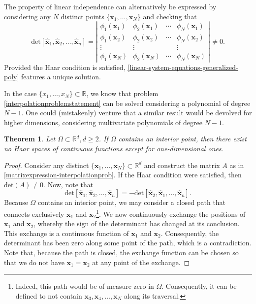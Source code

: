 \documentclass[12pt]{report} %
\newtheorem{theorem}{Theorem}
\newcommand{\tmmathbf}[1]{\ensuremath{\boldsymbol{#1}}}
\begin{document}
The property of linear independence can alternatively be expressed by
considering any $N$ distinct points  \{$\tmmathbf{x}_1, \ldots,
\tmmathbf{x}_N$\}  and checking that
\[ \text{det}  [\hat{\tmmathbf{x}}_1, \hat{\tmmathbf{x}}_2, \ldots,
   \hat{\tmmathbf{x}}_n] = \left|\begin{array}{cccc}
     \phi_1 (\tmmathbf{x}_1) & \phi_2 (\tmmathbf{x}_1) & \cdots  & \phi_N
     (\tmmathbf{x}_1)\\
     \phi_1 (\tmmathbf{x}_2) & \phi_2 (\tmmathbf{x}_2) & \cdots  & \phi_N
     (\tmmathbf{x}_2)\\
     \vdots & \vdots &  & \vdots\\
     \phi_1 (\tmmathbf{x}_N) & \phi_2 (\tmmathbf{x}_N) & \cdots  & \phi_N
     (\tmmathbf{x}_N)
   \end{array}\right| \neq 0. \]
Provided the Haar condition is satisfied,
\eqref{linear-system-equations-generalized-poly} features a unique solution.

In the case $\{ x_1, \ldots, x_N \} \subset \mathbb{R}$, we know that problem
\ref{interpolationproblemstatement} can be solved considering a polynomial of
degree $N - 1$. One could (mistakenly) venture that a similar result would be devolved for
higher dimensions, considering multivariate polynomials of degree $N-1$.

\begin{theorem}\label{thm-haar-spaces-polynomials}
  Let $\Omega \subset \mathbb{R}^d, d \geq 2$. If $\Omega$ contains an
  interior point, then there exist no Haar spaces of continuous functions except for one-dimensional ones.
\end{theorem}

\begin{proof}
  Consider any distinct $\{ \tmmathbf{x}_1, \ldots, \tmmathbf{x}_N \} \subset
  \mathbb{R}^d$ and construct the matrix $A$ as in
  \eqref{matrixexpression-interpolationprob}. If the Haar condition were
  satisfied, then $\text{det} (A) \neq 0$. Now, note that $$\text{det}
  [\hat{\tmmathbf{x}}_1, \hat{\tmmathbf{x}}_2, \ldots, \hat{\tmmathbf{x}}_n] =
  - \text{det} [\hat{\tmmathbf{x}}_2, \hat{\tmmathbf{x}}_1, \ldots,
  \hat{\tmmathbf{x}}_n].$$ Because $\Omega$ contains an interior point, we may
  consider a closed path that connects exclusively $\tmmathbf{x}_1$ and
  $\tmmathbf{x}_2$\footnote{Indeed, this path would be of measure zero in
  $\Omega$. Consequently, it can be defined to not contain $\tmmathbf{x}_3,
  \tmmathbf{x}_4, \ldots, \tmmathbf{x}_N$ along its traversal.}. We now
  continuously exchange the positions of $\tmmathbf{x}_1$ and
  $\tmmathbf{x}_2$, whereby the sign of the determinant has changed
  at its conclusion. This exchange is a continuous function of $\tmmathbf{x}_1$
  and $\tmmathbf{x}_2$. Consequently, the determinant has been zero along some
  point of the path, which is a contradiction. Note that, because the path is
  closed, the exchange function can be chosen so that we do not have
  $\tmmathbf{x}_1 = \tmmathbf{x}_2$ at any point of the exchange.
\end{proof}
\end{document}
